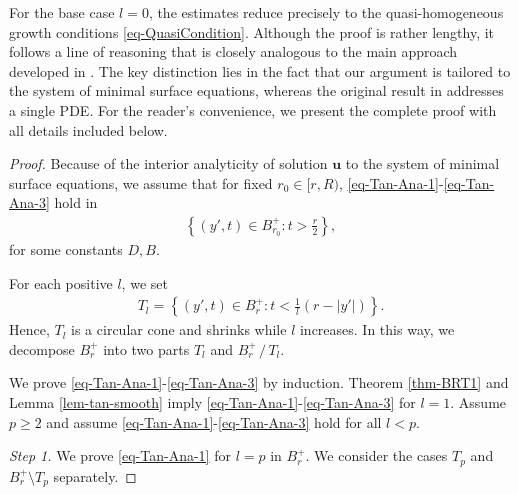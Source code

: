 \documentclass[11pt,reqno]{amsart}
\renewcommand{\geq}{\geqslant}
\theoremstyle{definition}
\numberwithin{equation}{section}
\begin{document}
For the base case $l=0$, the estimates reduce precisely to the quasi-homogeneous growth conditions \eqref{eq-QuasiCondition}. Although the proof is rather lengthy, it follows a line of reasoning that is closely analogous to the main approach developed in \cite{HanJiang1}. The key distinction lies in the fact that our argument is tailored to the system of minimal surface equations, whereas the original result in \cite{HanJiang1} addresses a single PDE. For the reader's convenience, we present the complete proof with all details included below.
\begin{proof}
    

    Because of the interior analyticity of solution $\mathbf u$ to the system of minimal surface equations, we assume that for fixed $r_0\in [r, R)$, \eqref{eq-Tan-Ana-1}-\eqref{eq-Tan-Ana-3} hold in
    \begin{align}\label{eq-Region1}
        \left\{(y', t)\in B^+_{r_0}: t> \frac{r}{2}\right\},
    \end{align}
    for some constants $D, B.$

    For each positive $l$, we set
    \begin{align}
        T_l = \left\{(y', t)\in B^+_r: t<\frac{1}{l}(r-|y'|)\right\}.
    \end{align}
Hence, $T_l$ is a circular cone and shrinks while $l$ increases. In this way, we decompose $B^+_r$
into two parts $T_l$ and $B^+_r \,/\, T_l$.

We prove \eqref{eq-Tan-Ana-1}-\eqref{eq-Tan-Ana-3} by induction. Theorem \ref{thm-BRT1} and Lemma \ref{lem-tan-smooth} imply \eqref{eq-Tan-Ana-1}-\eqref{eq-Tan-Ana-3} for $l=1.$ 
Assume $p\geq 2$ and assume \eqref{eq-Tan-Ana-1}-\eqref{eq-Tan-Ana-3} hold for all $l<p.$

\smallskip
{\it Step 1.} We prove \eqref{eq-Tan-Ana-1} for $l=p$ in $B^+_r$. We consider 
the cases $T_p$ and $B^+_r\setminus T_p$ separately. 


\end{proof}
\end{document}
